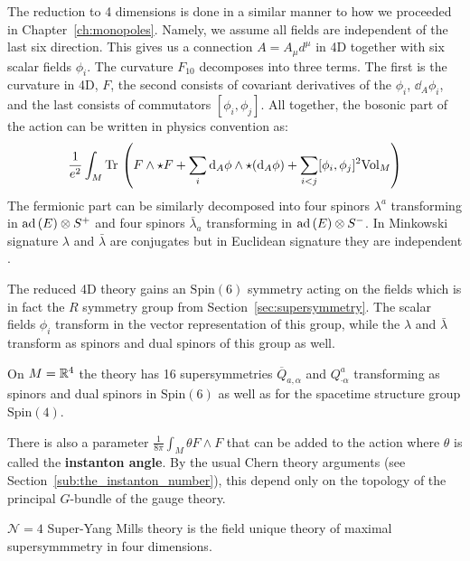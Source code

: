 The reduction to 4 dimensions is done in a similar manner to how we proceeded in Chapter~\ref{ch:monopoles}. Namely, we assume all fields are independent of the last six direction. This gives us a connection $A =A_\mu d^\mu$ in 4D together with six scalar fields $\phi_i$. The curvature $F_{10}$ decomposes into three terms. The first is the curvature in 4D, $F$, the second consists of covariant derivatives of the $\phi_i$, $\dd_A \phi_i$, and the last consists of commutators $[\phi_i, \phi_j]$. All together, the bosonic part of the action can be written in physics convention as:
\begin{equation}
	\frac{1}{e^2} \int_M \mathrm{Tr}\,\left( F \wedge \star F + \sum_i \mathrm{d}_A \phi \wedge \star (\mathrm{d}_A \phi) +  \sum_{i < j} [\phi_i, \phi_j]^2 \mathrm{Vol}_M \right)
\end{equation}
The fermionic part can be similarly decomposed into four spinors $\lambda^a$ transforming in $\mathrm{ad}\,(E) \otimes S^+$ and four spinors $\bar \lambda_a$ transforming in $\mathrm{ad}\,(E) \otimes S^-$. In Minkowski signature $\lambda$ and $\bar \lambda$ are conjugates but in Euclidean signature they are independent \cite{kapustin2008}.

The reduced 4D theory gains an $\mathrm{Spin}(6)$ symmetry acting on the fields which is in fact the $R$ symmetry group from Section~\ref{sec:supersymmetry}. The scalar fields $\phi_i$ transform in the vector representation of this group, while the $\lambda$ and $\bar \lambda$ transform as spinors and dual spinors of this group as well.

On $M=\mathbb{R}^4$ the theory has 16 supersymmetries $\overline Q_{a, \alpha}$ and $Q^a_{\cdot \alpha}$ transforming as spinors and dual spinors in $\mathrm{Spin}(6)$ as well as for the spacetime structure group $\mathrm{Spin}(4)$.

There is also a parameter $\frac{1}{8\pi} \int_M \theta F \wedge F$ that can be added to the action where $\theta$ is called the \textbf{instanton angle}. By the usual Chern theory arguments (see Section~\ref{sub:the_instanton_number}), this depend only on the topology of the principal $G$-bundle of the gauge theory.

\begin{phys}
	$\mathcal N=4$ Super-Yang Mills theory is the field unique theory of maximal supersymmmetry in four dimensions.
\end{phys}

